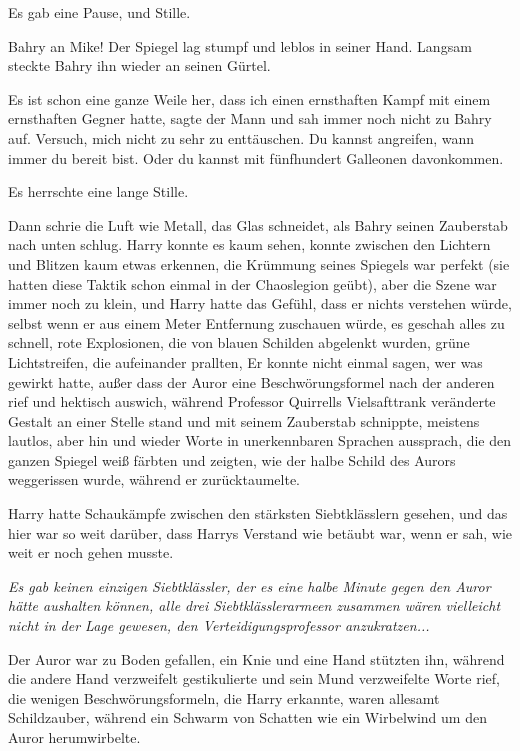 Es gab eine Pause, und Stille.

\glqq{}Bahry an Mike!\grqq{} Der Spiegel lag stumpf und leblos in seiner Hand. Langsam
steckte Bahry ihn wieder an seinen Gürtel.

\glqq{}Es ist schon eine ganze Weile her, dass ich einen ernsthaften Kampf mit
einem ernsthaften Gegner hatte\grqq{}, sagte der Mann und sah immer noch nicht
zu Bahry auf. \glqq{}Versuch, mich nicht zu sehr zu enttäuschen. Du kannst
angreifen, wann immer du bereit bist. Oder du kannst mit fünfhundert Galleonen
davonkommen.\grqq{}

Es herrschte eine lange Stille.

Dann schrie die Luft wie Metall, das Glas schneidet, als Bahry seinen Zauberstab
nach unten schlug. Harry konnte es kaum sehen, konnte zwischen den Lichtern und
Blitzen kaum etwas erkennen, die Krümmung seines Spiegels war perfekt (sie
hatten diese Taktik schon einmal in der Chaoslegion geübt), aber die Szene war
immer noch zu klein, und Harry hatte das Gefühl, dass er nichts verstehen würde,
selbst wenn er aus einem Meter Entfernung zuschauen würde, es geschah alles zu
schnell, rote Explosionen, die von blauen Schilden abgelenkt wurden, grüne
Lichtstreifen, die aufeinander prallten, Er konnte nicht einmal sagen, wer was
gewirkt hatte, außer dass der Auror eine Beschwörungsformel nach der anderen
rief und hektisch auswich, während Professor Quirrells Vielsafttrank veränderte
Gestalt an einer Stelle stand und mit seinem Zauberstab schnippte, meistens
lautlos, aber hin und wieder Worte in unerkennbaren Sprachen aussprach, die den
ganzen Spiegel weiß färbten und zeigten, wie der halbe Schild des Aurors
weggerissen wurde, während er zurücktaumelte.

Harry hatte Schaukämpfe zwischen den stärksten Siebtklässlern gesehen, und das
hier war so weit darüber, dass Harrys Verstand wie betäubt war, wenn er sah, wie
weit er noch gehen musste.

\emph{Es gab keinen einzigen Siebtklässler, der es eine halbe Minute gegen den
Auror hätte aushalten können, alle drei Siebtklässlerarmeen zusammen wären
vielleicht nicht in der Lage gewesen, den Verteidigungsprofessor anzukratzen...}

Der Auror war zu Boden gefallen, ein Knie und eine Hand stützten ihn, während
die andere Hand verzweifelt gestikulierte und sein Mund verzweifelte Worte rief,
die wenigen Beschwörungsformeln, die Harry erkannte, waren allesamt
Schildzauber, während ein Schwarm von Schatten wie ein Wirbelwind um den Auror
herumwirbelte.

